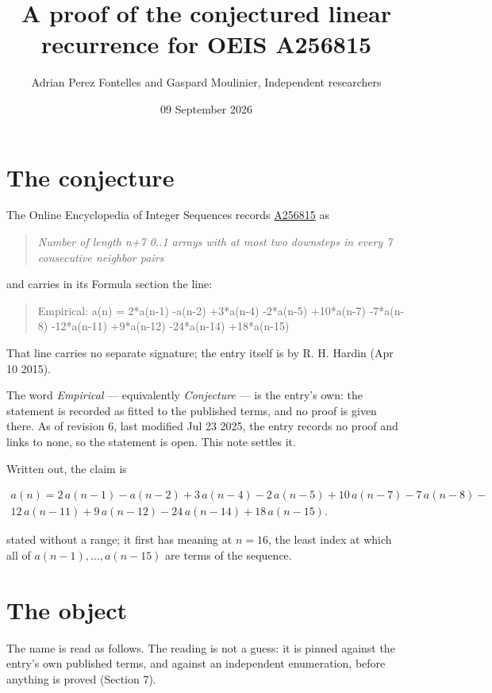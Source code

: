 \documentclass[11pt]{article}
\title{A proof of the conjectured linear recurrence for OEIS A256815}
\author{Adrian Perez Fontelles and Gaspard Moulinier, Independent researchers}
\date{09 September 2026}
\theoremstyle{definition}
\begin{document}
\maketitle
\section{The conjecture}

The Online Encyclopedia of Integer Sequences records \href{https://oeis.org/A256815}{A256815} as

\begin{quote}\itshape Number of length n+7 0..1 arrays with at most two downsteps in every 7 consecutive neighbor pairs\end{quote}

and carries in its Formula section the line:

\begin{quote}\ttfamily Empirical: a(n) = 2*a(n-1) -a(n-2) +3*a(n-4) -2*a(n-5) +10*a(n-7) -7*a(n-8) -12*a(n-11) +9*a(n-12) -24*a(n-14) +18*a(n-15)\end{quote}

That line carries no separate signature; the entry itself is by R. H. Hardin (Apr 10 2015).

The word {\itshape Empirical} --- equivalently {\itshape Conjecture} --- is the entry's own: the statement is recorded as fitted to the published terms, and no proof is given there. As of revision 6, last modified Jul 23 2025, the entry records no proof and links to none, so the statement is open. This note settles it.

Written out, the claim is

\begin{multline*} a(n) = 2\,a(n-1) - a(n-2) + 3\,a(n-4) - 2\,a(n-5) + 10\,a(n-7) - 7\,a(n-8) - \\ 12\,a(n-11) + 9\,a(n-12) - 24\,a(n-14) + 18\,a(n-15). \end{multline*}

stated without a range; it first has meaning at $n = 16$, the least index at which all of $a(n-1),\dots,a(n-15)$ are terms of the sequence.

\section{The object}

The name is read as follows. The reading is not a guess: it is pinned against the entry's own published terms, and against an independent enumeration, before anything is proved (Section 7).
\end{document}
